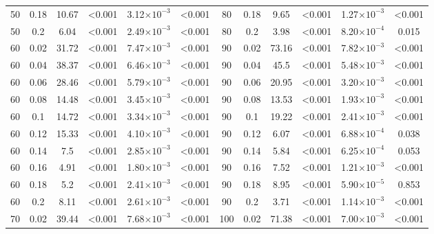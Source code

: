 \documentclass[12pt]{article}
\begin{document}
\begin{spacing}{2.0}
\begin{table}[h!]
\begin{tabular}{c c | c c| c c ||c c | c c | c c |}
        50  & 0.18  & 10.67 & \textless0.001  & 3.12$\times10^{-3}$ & \textless0.001  & 80  & 0.18  & 9.65  & \textless0.001  & 1.27$\times10^{-3}$ & \textless0.001  \\
        50  & 0.2 & 6.04  & \textless0.001  & 2.49$\times10^{-3}$ & \textless0.001  & 80  & 0.2 & 3.98  & \textless0.001  & 8.20$\times10^{-4}$ & 0.015 \\
        60  & 0.02  & 31.72 & \textless0.001  & 7.47$\times10^{-3}$ & \textless0.001  & 90  & 0.02  & 73.16 & \textless0.001  & 7.82$\times10^{-3}$ & \textless0.001  \\
        60  & 0.04  & 38.37 & \textless0.001  & 6.46$\times10^{-3}$ & \textless0.001  & 90  & 0.04  & 45.5  & \textless0.001  & 5.48$\times10^{-3}$ & \textless0.001  \\
        60  & 0.06  & 28.46 & \textless0.001  & 5.79$\times10^{-3}$ & \textless0.001  & 90  & 0.06  & 20.95 & \textless0.001  & 3.20$\times10^{-3}$ & \textless0.001  \\
        60  & 0.08  & 14.48 & \textless0.001  & 3.45$\times10^{-3}$ & \textless0.001  & 90  & 0.08  & 13.53 & \textless0.001  & 1.93$\times10^{-3}$ & \textless0.001  \\
        60  & 0.1 & 14.72 & \textless0.001  & 3.34$\times10^{-3}$ & \textless0.001  & 90  & 0.1 & 19.22 & \textless0.001  & 2.41$\times10^{-3}$ & \textless0.001  \\
        60  & 0.12  & 15.33 & \textless0.001  & 4.10$\times10^{-3}$ & \textless0.001  & 90  & 0.12  & 6.07  & \textless0.001  & 6.88$\times10^{-4}$ & 0.038 \\
        60  & 0.14  & 7.5 & \textless0.001  & 2.85$\times10^{-3}$ & \textless0.001  & 90  & 0.14  & 5.84  & \textless0.001  & 6.25$\times10^{-4}$ & 0.053 \\
        60  & 0.16  & 4.91  & \textless0.001  & 1.80$\times10^{-3}$ & \textless0.001  & 90  & 0.16  & 7.52  & \textless0.001  & 1.21$\times10^{-3}$ & \textless0.001  \\
        60  & 0.18  & 5.2 & \textless0.001  & 2.41$\times10^{-3}$ & \textless0.001  & 90  & 0.18  & 8.95  & \textless0.001  & 5.90$\times10^{-5}$ & 0.853 \\
        60  & 0.2 & 8.11  & \textless0.001  & 2.61$\times10^{-3}$ & \textless0.001  & 90  & 0.2 & 3.71  & \textless0.001  & 1.14$\times10^{-3}$ & \textless0.001  \\
        70  & 0.02  & 39.44 & \textless0.001  & 7.68$\times10^{-3}$ & \textless0.001  & 100 & 0.02  & 71.38 & \textless0.001  & 7.00$\times10^{-3}$ & \textless0.001  \\

\end{tabular}
\end{table}
\end{spacing}
\end{document}
